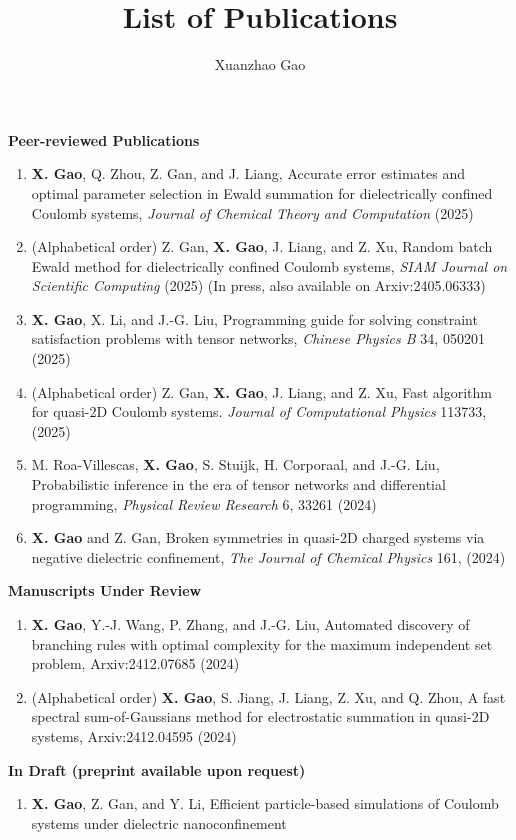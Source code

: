 \documentclass[aps,prl,reprint,showpacs,floatfix,superscriptaddress, onecolumn, 11pt]{revtex4-2}
\begin{document}

\title{List of Publications}
\author{Xuanzhao Gao}

\maketitle

\textbf{Peer-reviewed Publications}

\begin{enumerate}
  \item \textbf{X. Gao}, Q. Zhou, Z. Gan, and J. Liang, Accurate error estimates and optimal parameter selection in Ewald summation for dielectrically confined Coulomb systems, \textit{Journal of Chemical Theory and Computation} (2025)
  
  \item (Alphabetical order) Z. Gan, \textbf{X. Gao}, J. Liang, and Z. Xu, Random batch Ewald method for dielectrically confined Coulomb systems, \textit{SIAM Journal on Scientific Computing} (2025) (In press, also available on Arxiv:2405.06333)
  
  \item \textbf{X. Gao}, X. Li, and J.-G. Liu, Programming guide for solving constraint satisfaction problems with tensor networks, \textit{Chinese Physics B} 34, 050201 (2025)
  
  \item (Alphabetical order) Z. Gan, \textbf{X. Gao}, J. Liang, and Z. Xu, Fast algorithm for quasi-2D Coulomb systems. \textit{Journal of Computational Physics} 113733, (2025)
  
  \item M. Roa-Villescas, \textbf{X. Gao}, S. Stuijk, H. Corporaal, and J.-G. Liu, Probabilistic inference in the era of tensor networks and differential programming, \textit{Physical Review Research} 6, 33261 (2024)
  
  \item \textbf{X. Gao} and Z. Gan, Broken symmetries in quasi-2D charged systems via negative dielectric confinement, \textit{The Journal of Chemical Physics} 161, (2024)
\end{enumerate}

\textbf{Manuscripts Under Review}

\begin{enumerate}
\item \textbf{X. Gao}, Y.-J. Wang, P. Zhang, and J.-G. Liu, Automated discovery of branching rules with optimal complexity for the maximum independent set problem, Arxiv:2412.07685 (2024)
  
\item (Alphabetical order) \textbf{X. Gao}, S. Jiang, J. Liang, Z. Xu, and Q. Zhou, A fast spectral sum-of-Gaussians method for electrostatic summation in quasi-2D systems, Arxiv:2412.04595 (2024)
\end{enumerate}

\textbf{In Draft (preprint available upon request)}

\begin{enumerate}
\item \textbf{X. Gao}, Z. Gan, and Y. Li, Efficient particle-based simulations of Coulomb systems under dielectric nanoconfinement
\end{enumerate}
\end{document}
